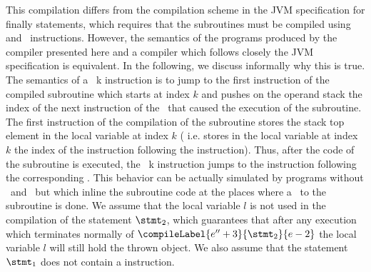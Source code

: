  

 This compilation differs from the compilation scheme in the JVM specification for finally statements, which requires that the subroutines must be compiled using  and 
 \ret \ instructions. However, the semantics of the programs produced by the compiler presented here and a compiler which follows closely the JVM specification 
 is equivalent. 
 In the following, we discuss informally why this is true.
 The semantics of a \jsr \ k instruction is to  jump to the first instruction of the compiled subroutine which starts at index $k$ and pushes on the
 operand stack the index of the next instruction of the \jsr \ that caused the execution of the subroutine. 
 The first instruction of the compilation
 of the subroutine stores the stack top element in the local variable at index $k$ ( i.e. stores in the local variable at index $k$ the
 index of the instruction following the \jsr{} instruction). Thus, after the code of the subroutine is 
 executed, the \ret \ k instruction jumps to 
 the instruction following the corresponding \jsr. This behavior can be actually simulated by programs without \jsr \ and \ret \ but which inline the subroutine code
 at the places where a \jsr \ to the subroutine is done.
 We assume that the local variable $l$ is not used in the compilation of the statement $\stmt_2$, which guarantees that after any execution which 
 terminates normally of $\compileLabel{e'' + 3}{\stmt_2}{e - 2}$ the local variable  $l$ will still hold the thrown object. We also assume that the 
 statement $\stmt_1$ does not contain a \return{} instruction. 




